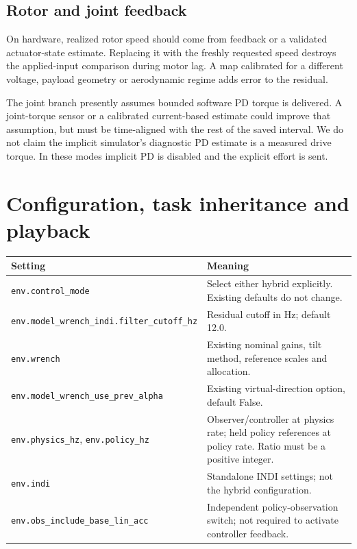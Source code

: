 \documentclass[11pt,a4paper]{article}
\begin{document}
\subsection{Rotor and joint feedback}
On hardware, realized rotor speed should come from feedback or a validated
actuator-state estimate. Replacing it with the freshly requested speed destroys
the applied-input comparison during motor lag. A map calibrated for a different
voltage, payload geometry or aerodynamic regime adds error to the residual.

The joint branch presently assumes bounded software PD torque is delivered.
A joint-torque sensor or a calibrated current-based estimate could improve that
assumption, but must be time-aligned with the rest of the saved interval. We do
not claim the implicit simulator's diagnostic PD estimate is a measured drive
torque. In these modes implicit PD is disabled and the explicit effort is sent.

\section{Configuration, task inheritance and playback}\label{sec:usage}

\begin{longtable}{L{5.4cm}L{9.3cm}}
\toprule Setting & Meaning\\\midrule\endhead
\texttt{env.control\_mode} & Select either hybrid explicitly. Existing defaults do not change.\\
\texttt{env.model\_wrench\_indi.}\newline\texttt{filter\_cutoff\_hz} & Residual cutoff in Hz; default 12.0.\\
\texttt{env.wrench} & Existing nominal gains, tilt method, reference scales and allocation.\\
\texttt{env.model\_wrench\_}\newline\texttt{use\_prev\_alpha} & Existing virtual-direction option, default False.\\
\texttt{env.physics\_hz}, \texttt{env.policy\_hz} & Observer/controller at physics rate; held policy references at policy rate. Ratio must be a positive integer.\\
\texttt{env.indi} & Standalone INDI settings; not the hybrid configuration.\\
\texttt{env.obs\_include\_}\newline\texttt{base\_lin\_acc} & Independent policy-observation switch; not required to activate controller feedback.\\\bottomrule
\end{longtable}
\end{document}
